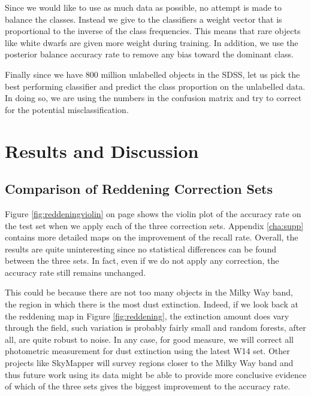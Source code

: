 Since we would like to use as much data as possible, no attempt is made to balance the classes.
Instead we give to the classifiers a weight vector that is proportional to the inverse
of the class frequencies. This means that rare objects like white dwarfs are given more
weight during training. In addition, we use the posterior balance accuracy rate to remove
any bias toward the dominant class.

Finally since we have 800 million unlabelled objects in the SDSS, let us pick the
best performing classifier and predict the class proportion on the unlabelled data.
In doing so, we are using the numbers in the confusion matrix and try to correct for the
potential misclassification.

\section{Results and Discussion}
\label{sec:results1}

\subsection{Comparison of Reddening Correction Sets}
\label{sec:extinction}

Figure \ref{fig:reddeningviolin} on page \pageref{fig:reddeningviolin} shows
the violin plot of the accuracy rate on the test
set when we apply each of the three correction sets. Appendix \ref{cha:supp} contains
more detailed maps on the improvement of the recall rate. Overall, the results are quite
uninteresting since no statistical differences can be found between the three sets. In fact,
even if we do not apply any correction, the accuracy rate still remains unchanged.

This could be because there are not too many objects in the Milky Way band,
the region in which there is the most dust extinction. Indeed, if we look back at the reddening map
in Figure \ref{fig:reddening}, the extinction amount does vary through the field, such 
variation is probably fairly small and random forests, after all, are quite robust to noise.
In any case, for good measure, we will correct all photometric measurement for dust
extinction using
the latest W14 set. Other projects like SkyMapper will survey regions closer to the Milky
Way band and thus future work using its data might be able to provide more conclusive
evidence of which of the three sets gives the biggest improvement to the accuracy rate.

